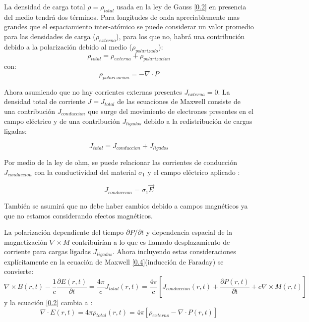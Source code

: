 \documentclass[a4paper,openright,12pt]{book}
\begin{document}
La densidad de carga total $\rho=\rho_{total}$ usada en la ley de Gauss \ref{0.2} en presencia del medio tendrá dos términos. Para longitudes de onda apreciablemente mas grandes que el espaciamiento inter-atómico se puede considerar un valor promedio para las densidades de carga ($\rho_{externo}$), para los que no, habrá una contribución debido a la polarización debido al medio ($\rho_{polarizado}$):
\begin{equation}
\rho_{total}=\rho_{externa}+\rho_{polarizacion}
\end{equation}
con:
\begin{equation}
\rho_{polarizacion}=-\nabla\cdot P
\end{equation}

Ahora asumiendo que no hay corrientes externas presentes $J_{externa}=0$. La densidad total de corriente $J=J_{total}$ de las ecuaciones de Maxwell consiste de una contribución $J_{conduccion}$ que surge del movimiento de electrones presentes en el campo eléctrico y de una contribución $J_{ligados}$ debido a la redistribución de cargas ligadas:

\begin{equation}
J_{total}=J_{conduccion}+J_{ligados}
\end{equation}

Por medio de la ley de ohm, se puede relacionar las corrientes de conducción $J_{conduccion}$ con la conductividad del material $\sigma_{1}$ y el campo eléctrico aplicado \cite{electrodynamics}:

\begin{equation}\label{1.7}
J_{conduccion}=\sigma_{1}\vec{E}
\end{equation}

También se asumirá que no debe haber cambios debido a campos magnéticos ya que no estamos considerando efectos magnéticos. 

La polarización dependiente del tiempo $\partial P/\partial t$ y dependencia espacial de la magnetización $\nabla\times M$ contribuirían a lo que es llamado desplazamiento de corriente para cargas ligadas $J_{ligados}$. Ahora incluyendo estas consideraciones explícitamente en la ecuación de Maxwell \ref{0.4}(inducción de Faraday) se convierte:
\begin{equation}
\nabla\times B(r,t)-\frac{1}{c}\frac{\partial E(r,t)}{\partial t}=\frac{4\pi}{c}J_{total}(r,t)=\frac{4\pi}{c}[J_{conduccion}(r,t)+\frac{\partial P(r,t)}{\partial t}+c\nabla \times M(r,t)]
\end{equation}
y la ecuación \ref{0.2} cambia a :
\begin{equation}
\nabla \cdot E(r,t)=4\pi \rho_{total}(r,t)=4\pi[\rho_{externo}-\nabla\cdot P(r,t)]
\end{equation}
\end{document}
